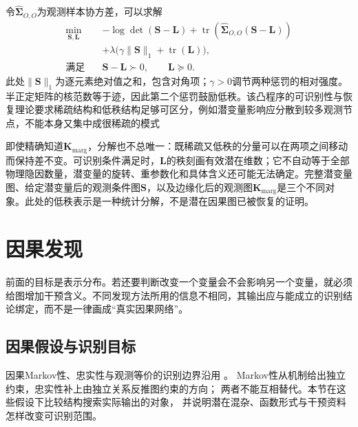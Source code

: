 令$\widehat{\bm{\Sigma}}_{O,O}$为观测样本协方差，可以求解
\begin{equation}
  \begin{aligned}
    \min_{\bm{S},\bm{L}}\quad&
      -\log\det(\bm{S}-\bm{L})
      +\operatorname{tr}\!\left(
           \widehat{\bm{\Sigma}}_{O,O}(\bm{S}-\bm{L})\right)\\
      &+\lambda\bigl(\gamma\lVert\bm{S}\rVert_1
                      +\operatorname{tr}(\bm{L})\bigr),\\
    \text{满足}\quad&\bm{S}-\bm{L}\succ0,\qquad \bm{L}\succeq0.
  \end{aligned}
  \label{eq:pgm-structure-learning-sparse-low-rank}
\end{equation}
此处$\lVert\bm{S}\rVert_1$为逐元素绝对值之和，包含对角项；$\gamma>0$调节两种惩罚的相对强度。半正定矩阵的核范数等于迹，因此第二个惩罚鼓励低秩。该凸程序的可识别性与恢复理论要求稀疏结构和低秩结构足够可区分，例如潜变量影响应分散到较多观测节点，不能本身又集中成很稀疏的模式

即使精确知道$\bm{K}_{\mathrm{marg}}$，分解也不总唯一：既稀疏又低秩的分量可以在两项之间移动而保持差不变。可识别条件满足时，$\bm{L}$的秩刻画有效潜在维数；它不自动等于全部物理隐因数量，潜变量的旋转、重参数化和具体含义还可能无法确定。完整潜变量图、给定潜变量后的观测条件图$\bm{S}$，以及边缘化后的观测图$\bm{K}_{\mathrm{marg}}$是三个不同对象。此处的低秩表示是一种统计分解，不是潜在因果图已被恢复的证明。

\section{因果发现}
\label{sec:pgm-structure-learning-causal}

前面的目标是表示分布。若还要判断改变一个变量会不会影响另一个变量，就必须给图增加干预含义。不同发现方法所用的信息不相同，其输出应与能成立的识别结论绑定，而不是一律画成“真实因果网络”。

\subsection{因果假设与识别目标}
\label{sec:pgm-structure-learning-causal-assumptions}

因果Markov性、忠实性与观测等价的识别边界沿用
。
Markov性从机制给出独立约束，忠实性补上由独立关系反推图约束的方向；
两者不能互相替代。本节在这些假设下比较结构搜索实际输出的对象，
并说明潜在混杂、函数形式与干预资料怎样改变可识别范围。


